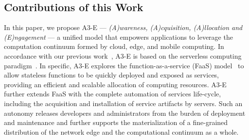 %


\subsection{Contributions of this Work}

In this paper, we propose A3-E --- \textit{(A)wareness, (A)cquisition, (A)llocation and (E)ngagement} --- a unified model that empowers applications to leverage the computation continuum formed by cloud, edge, and mobile computing. In accordance with our previous work~\cite{GarrigaMendonca2017}, A3-E is based on the serverless computing paradigm~\cite{Hendrickson:2016,baldini2017serverless}. In specific, A3-E explores the function-as-a-service (FaaS) model~\cite{MateosFaaster17} to allow stateless functions to be quickly deployed and exposed as services, providing an efficient and scalable allocation of computing resources. A3-E further extends FaaS with the complete automation of services life-cycle, including the acquisition and installation of service artifacts by servers. Such an autonomy releases developers and administrators from the burden of deployment and maintenance and further supports the materialization of a fine-grained distribution of the network edge and the computational continuum as a whole. %



